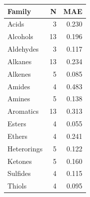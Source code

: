 \begin{tabular}{lrr}
\toprule
Family & N & MAE \\
\midrule
Acids & 3 & 0.230 \\
Alcohols & 13 & 0.196 \\
Aldehydes & 3 & 0.117 \\
Alkanes & 13 & 0.234 \\
Alkenes & 5 & 0.085 \\
Amides & 4 & 0.483 \\
Amines & 5 & 0.138 \\
Aromatics & 13 & 0.313 \\
Esters & 4 & 0.055 \\
Ethers & 4 & 0.241 \\
Heterorings & 5 & 0.122 \\
Ketones & 5 & 0.160 \\
Sulfides & 4 & 0.115 \\
Thiols & 4 & 0.095 \\
\bottomrule
\end{tabular}
